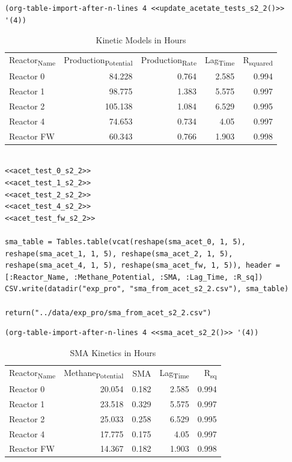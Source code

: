 \documentclass[11pt]{article}
\begin{document}
\begin{verbatim}
(org-table-import-after-n-lines 4 <<update_acetate_tests_s2_2()>> '(4))
\end{verbatim}

\begin{table}[htbp]
\caption{Kinetic Models in Hours}
\centering
\begin{tabular}{lrrrr}
Reactor\textsubscript{Name} & Production\textsubscript{Potential} & Production\textsubscript{Rate} & Lag\textsubscript{Time} & R\textsubscript{squared}\\[0pt]
Reactor 0 & 84.228 & 0.764 & 2.585 & 0.994\\[0pt]
Reactor 1 & 98.775 & 1.383 & 5.575 & 0.997\\[0pt]
Reactor 2 & 105.138 & 1.084 & 6.529 & 0.995\\[0pt]
Reactor 4 & 74.653 & 0.734 & 4.05 & 0.997\\[0pt]
Reactor FW & 60.343 & 0.766 & 1.903 & 0.998\\[0pt]
\end{tabular}
\end{table}

\begin{verbatim}

<<acet_test_0_s2_2>>
<<acet_test_1_s2_2>>
<<acet_test_2_s2_2>>
<<acet_test_4_s2_2>>
<<acet_test_fw_s2_2>>

sma_table = Tables.table(vcat(reshape(sma_acet_0, 1, 5), reshape(sma_acet_1, 1, 5), reshape(sma_acet_2, 1, 5), reshape(sma_acet_4, 1, 5), reshape(sma_acet_fw, 1, 5)), header = [:Reactor_Name, :Methane_Potential, :SMA, :Lag_Time, :R_sq])
CSV.write(datadir("exp_pro", "sma_from_acet_s2_2.csv"), sma_table)

return("../data/exp_pro/sma_from_acet_s2_2.csv")
\end{verbatim}

\begin{verbatim}
(org-table-import-after-n-lines 4 <<sma_acet_s2_2()>> '(4))
\end{verbatim}

\begin{table}[htbp]
\caption{SMA Kinetics in Hours}
\centering
\begin{tabular}{lrrrr}
Reactor\textsubscript{Name} & Methane\textsubscript{Potential} & SMA & Lag\textsubscript{Time} & R\textsubscript{sq}\\[0pt]
Reactor 0 & 20.054 & 0.182 & 2.585 & 0.994\\[0pt]
Reactor 1 & 23.518 & 0.329 & 5.575 & 0.997\\[0pt]
Reactor 2 & 25.033 & 0.258 & 6.529 & 0.995\\[0pt]
Reactor 4 & 17.775 & 0.175 & 4.05 & 0.997\\[0pt]
Reactor FW & 14.367 & 0.182 & 1.903 & 0.998\\[0pt]
\end{tabular}
\end{table}
\end{document}
